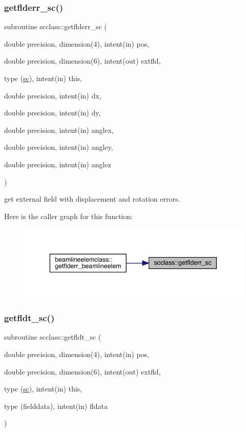 \subsubsection{\texorpdfstring{getflderr\_sc()}{getflderr\_sc()}}
{\footnotesize\ttfamily subroutine scclass\+::getflderr\+\_\+sc (\begin{DoxyParamCaption}\item[{double precision, dimension(4), intent(in)}]{pos,  }\item[{double precision, dimension(6), intent(out)}]{extfld,  }\item[{type (\mbox{\hyperlink{namespacescclass_structscclass_1_1sc}{sc}}), intent(in)}]{this,  }\item[{double precision, intent(in)}]{dx,  }\item[{double precision, intent(in)}]{dy,  }\item[{double precision, intent(in)}]{anglex,  }\item[{double precision, intent(in)}]{angley,  }\item[{double precision, intent(in)}]{anglez }\end{DoxyParamCaption})}



get external field with displacement and rotation errors. 

Here is the caller graph for this function\+:\nopagebreak
\begin{figure}[H]
\begin{center}
\leavevmode
\includegraphics[width=343pt]{namespacescclass_abe42c84df8190cc0443752dff296dd89_icgraph}
\end{center}
\end{figure}
\mbox{\label{namespacescclass_a73840f6e9b85c73425db1f08ab539aa2}} 
\subsubsection{\texorpdfstring{getfldt\_sc()}{getfldt\_sc()}}
{\footnotesize\ttfamily subroutine scclass\+::getfldt\+\_\+sc (\begin{DoxyParamCaption}\item[{double precision, dimension(4), intent(in)}]{pos,  }\item[{double precision, dimension(6), intent(out)}]{extfld,  }\item[{type (\mbox{\hyperlink{namespacescclass_structscclass_1_1sc}{sc}}), intent(in)}]{this,  }\item[{type (fielddata), intent(in)}]{fldata }\end{DoxyParamCaption})}




